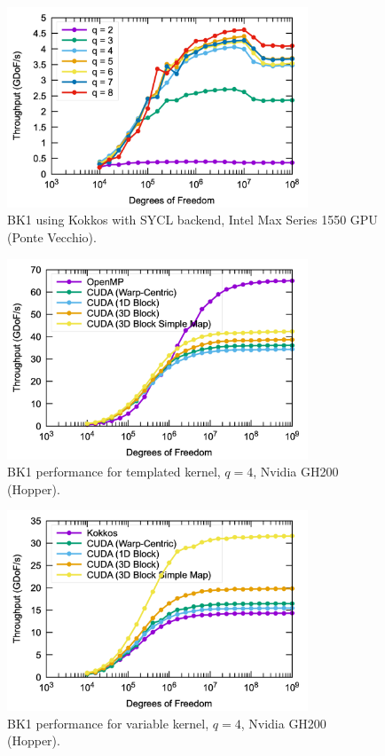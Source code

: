 \documentclass[a4paper,12pt]{article}
\begin{document}
\begin{figure}[htbp]
  \centering
  \includegraphics[width=0.8\textwidth]{pvc_kokkos} %
  \caption{BK1 using Kokkos with SYCL backend, Intel Max Series 1550 GPU (Ponte Vecchio).}
  \label{fig:pvc_kokkos}
\end{figure}

%
%

\begin{figure}[htbp]
  \centering
  \includegraphics[width=0.8\textwidth]{gh200_templated} %
  \caption{BK1 performance for templated kernel, $q = 4$, Nvidia GH200 (Hopper).}
  \label{fig:gh200_templated}
\end{figure}

\begin{figure}[htbp]
  \centering
  \includegraphics[width=0.8\textwidth]{gh200_variable} %
  \caption{BK1 performance for variable kernel, $q = 4$, Nvidia GH200 (Hopper).}
  \label{fig:gh200_variable}
\end{figure}
\end{document}
